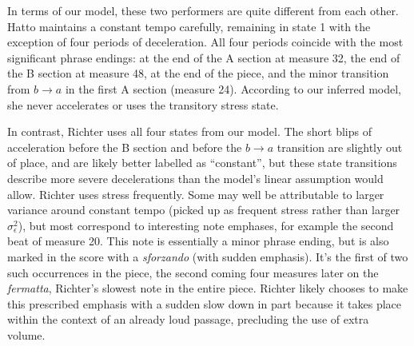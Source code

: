 \documentclass[12pt]{article}
\begin{document}
In terms of our model, these two performers are quite different
from each other. Hatto maintains a constant tempo carefully, remaining
in state 1 with the exception of four periods of deceleration. All
four periods coincide with the most significant phrase endings: at the
end of the A section at measure 32, the end of the B section at
measure 48, at the end of the piece, and the minor transition from
$b\rightarrow a$ in the first A section (measure 24). According
to our inferred model, she never accelerates or uses the transitory
stress state.

In contrast, Richter uses all four states from our model. The short
blips of acceleration before the B section and before the
$b \rightarrow a$ transition are slightly out of place, and are
likely better labelled as ``constant'', but these state transitions
describe more severe decelerations than the model's linear
assumption would allow. Richter uses stress frequently. Some may well be
attributable to larger variance around constant tempo (picked up as
frequent stress rather than larger $\sigma^2_\epsilon$), but most
correspond to interesting note emphases, for example the second beat
of measure 20. This note is essentially a minor phrase ending, but is
also marked in the score with a {\em sforzando} (with sudden
emphasis). It's the first of two such occurrences in the piece, the
second coming four measures later on the {\em fermatta}, Richter's slowest
note in the entire piece. Richter likely chooses to make this
prescribed emphasis with a sudden slow down in part because it takes
place within the context of an already loud passage, precluding the
use of extra volume.
\begin{table}[tb]
  \centering
  \caption{The estimated parameters for performances by Richter and
    Hatto.}
\label{tab:two-perf-parm}
\end{table}
\end{document}
